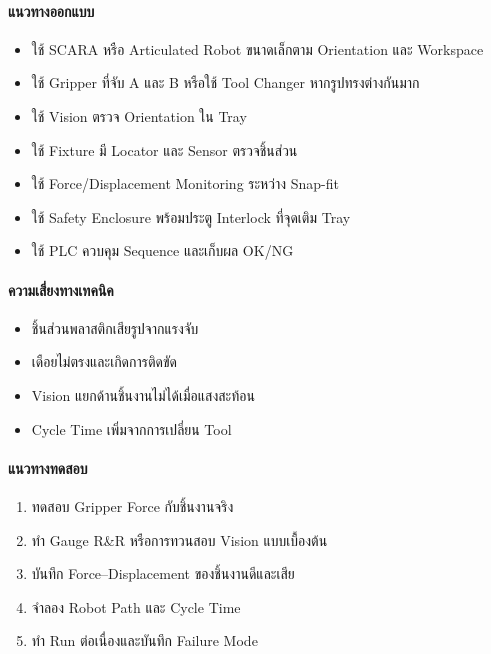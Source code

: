 \paragraph{แนวทางออกแบบ}

\begin{itemize}
    \item ใช้ SCARA หรือ Articulated Robot ขนาดเล็กตาม Orientation และ Workspace
    \item ใช้ Gripper ที่จับ A และ B หรือใช้ Tool Changer หากรูปทรงต่างกันมาก
    \item ใช้ Vision ตรวจ Orientation ใน Tray
    \item ใช้ Fixture มี Locator และ Sensor ตรวจชิ้นส่วน
    \item ใช้ Force/Displacement Monitoring ระหว่าง Snap-fit
    \item ใช้ Safety Enclosure พร้อมประตู Interlock ที่จุดเติม Tray
    \item ใช้ PLC ควบคุม Sequence และเก็บผล OK/NG
\end{itemize}

\paragraph{ความเสี่ยงทางเทคนิค}

\begin{itemize}
    \item ชิ้นส่วนพลาสติกเสียรูปจากแรงจับ
    \item เดือยไม่ตรงและเกิดการติดขัด
    \item Vision แยกด้านชิ้นงานไม่ได้เมื่อแสงสะท้อน
    \item Cycle Time เพิ่มจากการเปลี่ยน Tool
\end{itemize}

\paragraph{แนวทางทดสอบ}

\begin{enumerate}
    \item ทดสอบ Gripper Force กับชิ้นงานจริง
    \item ทำ Gauge R\&R หรือการทวนสอบ Vision แบบเบื้องต้น
    \item บันทึก Force–Displacement ของชิ้นงานดีและเสีย
    \item จำลอง Robot Path และ Cycle Time
    \item ทำ Run ต่อเนื่องและบันทึก Failure Mode
\end{enumerate}

